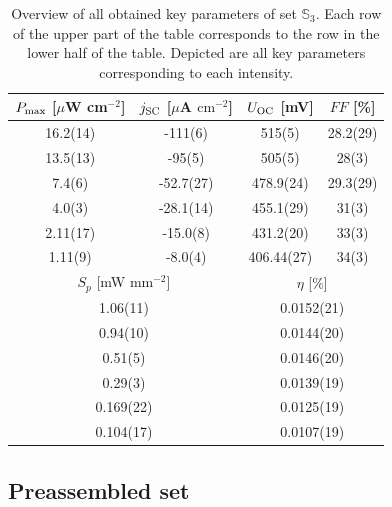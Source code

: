 \documentclass[a4paper,10pt,twocolumn]{article}
\begin{document}
\begin{extract*}
\begin{table}[h]
	\caption{Overview of all obtained key parameters of set $\mathbb{S}_3$. Each row of the upper part of the table corresponds to the row in the lower half of the table. Depicted are all key parameters corresponding to each intensity.}
	\label{tab:OSC3table}
	\begin{tabular}{@{}cccc@{}}
		\toprule
		$P_{\text{max}}$ [$\mu$W cm$^{-2}$] & $j_{\text{SC}}$ [$\mu$A $\mathrm{cm}^{-2}$] & $U_{\text{OC}}$ [mV]     & $FF$ [\%]     \\ \midrule
		16.2(14)                   & -111(6)                            & 515(5)          & 28.2(29)      \\
		13.5(13)                   & -95(5)                             & 505(5)          & 28(3)         \\
		7.4(6)                     & -52.7(27)                          & 478.9(24)       & 29.3(29)      \\
		4.0(3)                     & -28.1(14)                          & 455.1(29)       & 31(3)         \\
		2.11(17)                   & -15.0(8)                           & 431.2(20)       & 33(3)         \\
		1.11(9)                    & -8.0(4)                            & 406.44(27)      & 34(3)         \\ \midrule
		\multicolumn{2}{c}{$S_p$ [mW mm$^{-2}$]}                        & \multicolumn{2}{c}{$\eta$ [\%]} \\ \midrule
		\multicolumn{2}{c}{1.06(11)}                                    & \multicolumn{2}{c}{0.0152(21)}  \\
		\multicolumn{2}{c}{0.94(10)}                                    & \multicolumn{2}{c}{0.0144(20)}  \\
		\multicolumn{2}{c}{0.51(5)}                                     & \multicolumn{2}{c}{0.0146(20)}  \\
		\multicolumn{2}{c}{0.29(3)}                                     & \multicolumn{2}{c}{0.0139(19)}  \\
		\multicolumn{2}{c}{0.169(22)}                                   & \multicolumn{2}{c}{0.0125(19)}  \\
		\multicolumn{2}{c}{0.104(17)}                                   & \multicolumn{2}{c}{0.0107(19)}  \\ \bottomrule
	\end{tabular}
\end{table}

\subsection{Preassembled set}


\end{extract*}
\end{document}

